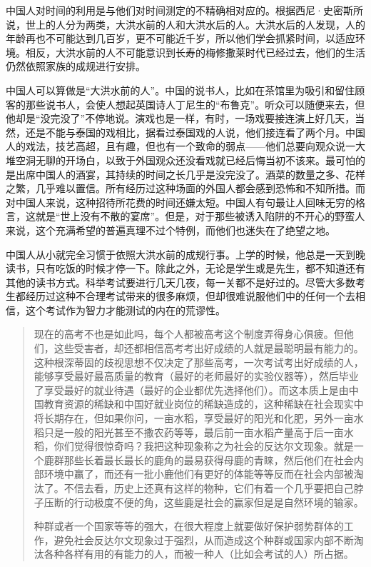 \documentclass[12pt,oneside]{book}
\begin{document}
\begin{common-format}
中国人对时间的利用是与他们对时间测定的不精确相对应的。根据西尼·史密斯所说，世上的人分为两类，大洪水前的人和大洪水后的人。大洪水后的人发现，人的年龄再也不可能达到几百岁，更不可能近千岁，所以他们学会抓紧时间，以适应环境。相反，大洪水前的人不可能意识到长寿的梅修撒莱时代已经过去，他们的生活仍然依照家族的成规进行安排。 

中国人可以算做是“大洪水前的人”。中国的说书人，比如在茶馆里为吸引和留住顾客的那些说书人，会使人想起英国诗人丁尼生的“布鲁克”。听众可以随便来去，但他却是“没完没了”不停地说。演戏也是一样，有时，一场戏要接连演上好几天，当然，还是不能与泰国的戏相比，据看过泰国戏的人说，他们接连看了两个月。中国人的戏法，技艺高超，且有趣，但也有一个致命的弱点——他们总要向观众说一大堆空洞无聊的开场白，以致于外国观众还没看戏就已经后悔当初不该来。最可怕的是出席中国人的酒宴，其持续的时间之长几乎是没完没了。酒菜的数量之多、花样之繁，几乎难以置信。所有经历过这种场面的外国人都会感到恐怖和不知所措。而对中国人来说，这种招待所花费的时间还嫌太短。中国人有句最让人回味无穷的格言，这就是“世上没有不散的宴席”。但是，对于那些被诱入陷阱的不开心的野蛮人来说，这个充满希望的普遍真理不过个特例，而他们也迷失在了绝望之地。

中国人从小就完全习惯于依照大洪水前的成规行事。上学的时候，他总是一天到晚读书，只有吃饭的时候才停一下。除此之外，无论是学生或是先生，都不知道还有其他的读书方式。科举考试要进行几天几夜，每一关都不是好过的。尽管大多数考生都经历过这种不合理考试带来的很多麻烦，但却很难说服他们中的任何一个去相信，这个考试作为智力才能测试的内在的荒谬性。

\begin{quotation}
现在的高考不也是如此吗，每个人都被高考这个制度弄得身心俱疲。但他们，这些受害者，却还都相信高考考出好成绩的人就是最聪明最有能力的。这种根深蒂固的歧视思想不仅决定了那些高考，一次考试考出好成绩的人，能够享受最好最高质量的教育（最好的老师最好的实验仪器等），然后毕业了享受最好的就业待遇（最好的企业都优先选择他们）。而这本质上是由中国教育资源的稀缺和中国好就业岗位的稀缺造成的，这种稀缺在社会现实中将长期存在，但如果你问，一亩水稻，享受最好的阳光和化肥，另外一亩水稻只是一般的阳光甚至不撒农药等等，最后前一亩水稻产量高于后一亩水稻，你们觉得很惊奇吗？我把这种现象称之为社会的反达尔文现象。就是一个鹿群那些长着最长最长的鹿角的最易获得母鹿的青睐，然后他们在社会内部环境中赢了，而还有一批小鹿他们有更好的体能等等反而在社会内部被淘汰了。不信去看，历史上还真有这样的物种，它们有着一个几乎要把自己脖子压断的行动极度不便的角，这些鹿是社会的赢家但是是自然环境的输家。

种群或者一个国家等等的强大，在很大程度上就要做好保护弱势群体的工作，避免社会反达尔文现象过于强烈，从而造成这个种群或国家内部不断淘汰各种各样有用的有能力的人，而被一种人（比如会考试的人）所占据。


\end{quotation}
\end{common-format}
\end{document}
